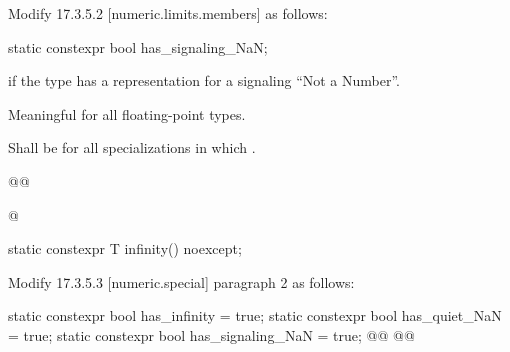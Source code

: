 Modify 17.3.5.2 [numeric.limits.members] as follows:
\begin{wgText}
  \setcounter{Paras}{41}
\begin{itemdecl}
static constexpr bool has_signaling_NaN;
\end{itemdecl}

\begin{itemdescr}
  \pnum
   if the type has a representation for a signaling “Not a Number”.

  \pnum
  Meaningful for all floating-point types.

  \pnum
  Shall be  for all specializations in which .
\end{itemdescr}

\begin{wgBRem}
\begin{itemdecl}
@@
\end{itemdecl}

\begin{itemdescr}
  \pnum

  \pnum
\end{itemdescr}

\begin{itemdecl}
@
\end{itemdecl}

\begin{itemdescr}
  \pnum
\end{itemdescr}
\end{wgBRem}

\begin{itemdecl}
static constexpr T infinity() noexcept;
\end{itemdecl}
\end{wgText}

Modify 17.3.5.3 [numeric.special] paragraph 2 as follows:
\begin{wgText}
\begin{codeblock}
    static constexpr bool has_infinity = true;
    static constexpr bool has_quiet_NaN = true;
    static constexpr bool has_signaling_NaN = true;
    @@
    @@

\end{codeblock}
\end{wgText}

